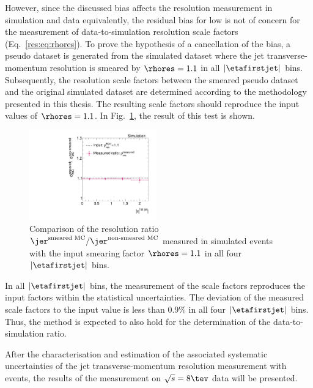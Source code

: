 However, since the discussed bias affects the resolution measurement in simulation and data equivalently, the residual bias for low \ptgamma is not of concern for the measurement of data-to-simulation resolution scale factors \rhores (Eq.~\eqref{res:eq:rhores}). 
To prove the hypothesis of a cancellation of the bias, a pseudo dataset is generated from the simulated dataset where the jet transverse-momentum resolution is smeared by $\rhores =1.1$ in all $|\etafirstjet|$ bins. 
Subsequently, the resolution scale factors between the smeared pseudo dataset and the original simulated dataset are determined according to the methodology presented in this thesis.
The resulting scale factors \rhores should reproduce the input values of $\rhores=1.1$.
In Fig.~\ref{res:fig:MCClosureRatio}, the result of this test is shown.
\begin{figure}[~t]
  \centering
    \includegraphics[width=0.49\textwidth]{figures/resolution/methodology/MCClosureRatio.pdf}
     \caption{Comparison of the resolution ratio $\jer^{\text{smeared MC}}/\jer^{\text{non-smeared MC}}$ measured in simulated events with the input smearing factor $\rhores=1.1$ in all four $|\etafirstjet|$ bins.}
  \label{res:fig:MCClosureRatio}
\end{figure}
In all $|\etafirstjet|$ bins, the measurement of the scale factors reproduces the input factors within the statistical uncertainties.
The deviation of the measured scale factors to the input value is less than 0.9\% in all four $|\etafirstjet|$ bins.
Thus, the method is expected to also hold for the determination of the data-to-simulation ratio.

After the characterisation and estimation of the associated systematic uncertainties of the jet transverse-momentum resolution measurement with \GAMJET events, the results of the measurement on $\sqrt{s}=8\tev$ data will be presented.
\FloatBarrier
